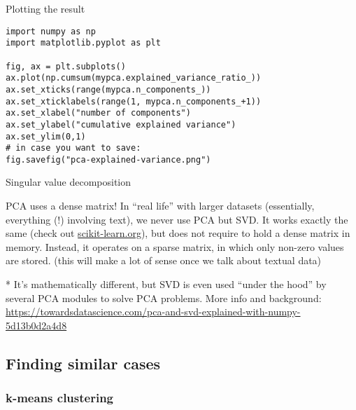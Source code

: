 \begin{frame}{Plotting the result}
  \begin{verbatim}
import numpy as np
import matplotlib.pyplot as plt

fig, ax = plt.subplots()
ax.plot(np.cumsum(mypca.explained_variance_ratio_))
ax.set_xticks(range(mypca.n_components_))
ax.set_xticklabels(range(1, mypca.n_components_+1))
ax.set_xlabel("number of components") 
ax.set_ylabel("cumulative explained variance") 
ax.set_ylim(0,1)
# in case you want to save:
fig.savefig("pca-explained-variance.png")
\end{verbatim}


\end{frame}






\begin{frame}{Singular value decomposition}

\begin{alertblock}{PCA uses a dense matrix!}
In ``real life'' with larger datasets (essentially, everything (!) involving text), we never use PCA but SVD. It works exactly the same (check out \url{scikit-learn.org}), but does not require to hold a dense matrix in memory. Instead, it operates on a sparse matrix, in which only non-zero values are stored. (this will make a lot of sense once we talk about textual data)
\end{alertblock}

  
\footnotesize{
* It's mathematically different, but SVD is even used ``under the hood'' by several PCA modules to solve PCA problems.
More info and background: \url{https://towardsdatascience.com/pca-and-svd-explained-with-numpy-5d13b0d2a4d8}}
\end{frame}







\subsection{Finding similar cases}

\subsubsection{k-means clustering}

